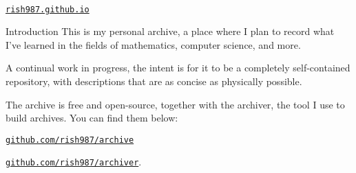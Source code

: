 \begin{center}
  {\LARGE {}}\\
  \vspace{10pt}
  \large 
  \href{https://rish987.github.io/}{\tt {rish987.github.io}}\\
\end{center}
\begin{part}{Introduction}
  This is my personal archive,
  a place where I plan to record
  what I've learned in the fields of 
  mathematics, computer science, and more.

  A continual work in progress, the intent is 
  for it to be a completely self-contained repository,
  with descriptions that are as concise as physically possible.

  The archive is free and open-source, 
  together with the archiver, the tool I use to build archives.
  You can find them below:

  \href{https://github.com/rish987/archive}{\tt github.com/rish987/archive}

  \href{https://github.com/rish987/archiver}{\tt github.com/rish987/archiver}.

\end{part}

